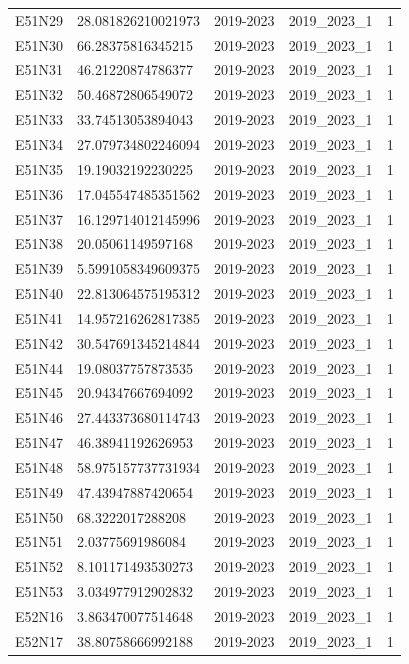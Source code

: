 \begin{landscape}
\begin{longtable}{lllll}
E51N29 & 28.081826210021973 & 2019-2023 & 2019\_2023\_1 & 1 \\
E51N30 & 66.28375816345215 & 2019-2023 & 2019\_2023\_1 & 1 \\
E51N31 & 46.21220874786377 & 2019-2023 & 2019\_2023\_1 & 1 \\
E51N32 & 50.46872806549072 & 2019-2023 & 2019\_2023\_1 & 1 \\
E51N33 & 33.74513053894043 & 2019-2023 & 2019\_2023\_1 & 1 \\
E51N34 & 27.079734802246094 & 2019-2023 & 2019\_2023\_1 & 1 \\
E51N35 & 19.19032192230225 & 2019-2023 & 2019\_2023\_1 & 1 \\
E51N36 & 17.045547485351562 & 2019-2023 & 2019\_2023\_1 & 1 \\
E51N37 & 16.129714012145996 & 2019-2023 & 2019\_2023\_1 & 1 \\
E51N38 & 20.05061149597168 & 2019-2023 & 2019\_2023\_1 & 1 \\
E51N39 & 5.5991058349609375 & 2019-2023 & 2019\_2023\_1 & 1 \\
E51N40 & 22.813064575195312 & 2019-2023 & 2019\_2023\_1 & 1 \\
E51N41 & 14.957216262817385 & 2019-2023 & 2019\_2023\_1 & 1 \\
E51N42 & 30.547691345214844 & 2019-2023 & 2019\_2023\_1 & 1 \\
E51N44 & 19.08037757873535 & 2019-2023 & 2019\_2023\_1 & 1 \\
E51N45 & 20.94347667694092 & 2019-2023 & 2019\_2023\_1 & 1 \\
E51N46 & 27.443373680114743 & 2019-2023 & 2019\_2023\_1 & 1 \\
E51N47 & 46.38941192626953 & 2019-2023 & 2019\_2023\_1 & 1 \\
E51N48 & 58.975157737731934 & 2019-2023 & 2019\_2023\_1 & 1 \\
E51N49 & 47.43947887420654 & 2019-2023 & 2019\_2023\_1 & 1 \\
E51N50 & 68.3222017288208 & 2019-2023 & 2019\_2023\_1 & 1 \\
E51N51 & 2.03775691986084 & 2019-2023 & 2019\_2023\_1 & 1 \\
E51N52 & 8.101171493530273 & 2019-2023 & 2019\_2023\_1 & 1 \\
E51N53 & 3.034977912902832 & 2019-2023 & 2019\_2023\_1 & 1 \\
E52N16 & 3.863470077514648 & 2019-2023 & 2019\_2023\_1 & 1 \\
E52N17 & 38.80758666992188 & 2019-2023 & 2019\_2023\_1 & 1 \\

\end{longtable}
\end{landscape}

